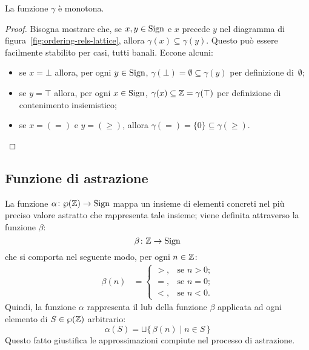 \begin{proposizione}
La funzione $\gamma$ è monotona.
\end{proposizione}
\begin{proof}
  Bisogna mostrare che, se $x, y \in \mathrm{Sign}$ e $x$ precede $y$ nel diagramma
  di figura~\ref{fig:ordering-rels-lattice}, allora
  $\gamma(x) \subseteq \gamma(y)$.
  Questo può essere facilmente stabilito per casi, tutti banali.
  Eccone alcuni:
  \begin{itemize}
    \item
      se $x = \bot$ allora, per ogni $y \in \mathrm{Sign}$,
      $\gamma(\bot) = \emptyset \subseteq \gamma(y)$
      per definizione di~$\emptyset$;
    \item
      se $y = \top$ allora, per ogni $x \in \mathrm{Sign}$,
      $\gamma(x) \subseteq \mathbb{Z} = \gamma(\top)$
      per definizione di contenimento insiemistico;
    \item
      se $x = (=)$ e $y = (\geq)$, allora
      $\gamma(=) = \{0\} \subseteq \gamma(\geq)$.
  \end{itemize}
\end{proof}

\subsection{Funzione di astrazione}

\begin{definizione} 
La funzione $\mathord{\alpha}\colon\wp(\mathbb{Z})\to\mathrm{Sign}$ mappa un insieme
di elementi concreti nel più preciso valore astratto che rappresenta
tale insieme; viene definita attraverso la funzione $\beta$:
\[
  \mathord{\beta}\colon\mathbb{Z}\to\mathrm{Sign}
\]
che si comporta nel seguente modo, per ogni $n \in \mathbb{Z}$:
\begin{align*}
  \beta(n) &=
    \begin{cases}
      >,      &\text{se $n  >  0$;} \\
      =,      &\text{se $n = 0$;} \\
      <,      &\text{se $n < 0$.}
    \end{cases} 
\end{align*}
Quindi, la funzione $\alpha$ rappresenta il $\mathop{\mathrm{lub}}\nolimits$ della
funzione $\beta$ applicata ad ogni elemento di $S \in \wp(\mathbb{Z})$ arbitrario:
\[
  \alpha(S) = \sqcup \{\, \beta(n) \mid n \in S \,\}
\]
Questo fatto giustifica le approssimazioni compiute nel processo
di astrazione.
\end{definizione}

